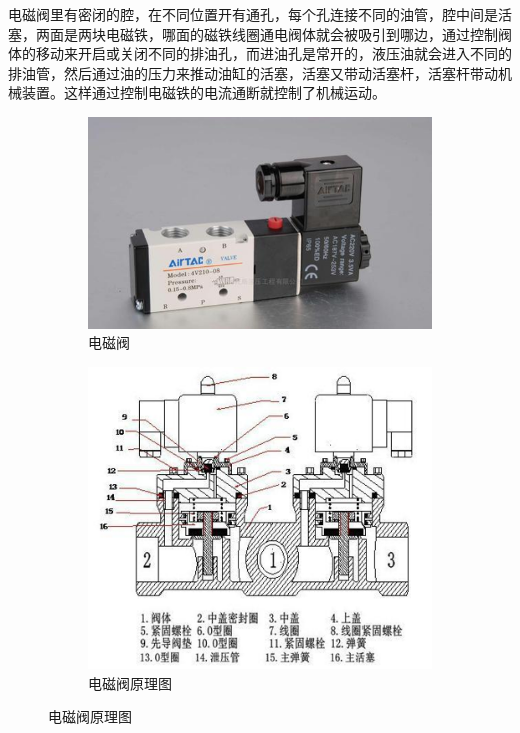 \documentclass[UTF8]{article} %
\begin{document}
\begin{enumerate}
  电磁阀里有密闭的腔，在不同位置开有通孔，每个孔连接不同的油管，腔中间是活塞，两面是两块电磁铁，哪面的磁铁线圈通电阀体就会被吸引到哪边，通过控制阀体的移动来开启或关闭不同的排油孔，而进油孔是常开的，液压油就会进入不同的排油管，然后通过油的压力来推动油缸的活塞，活塞又带动活塞杆，活塞杆带动机械装置。这样通过控制电磁铁的电流通断就控制了机械运动。

  \begin{figure}[H]
    \centering
    \begin{subfigure}[b]{0.4\textwidth}
           \centering
           \includegraphics[width=\textwidth]{qi4.png}
            \caption{电磁阀}
    \end{subfigure}
    \quad
    \begin{subfigure}[b]{0.3\textwidth}
            \centering
            \includegraphics[width=\textwidth]{qi5.png}
            \caption{电磁阀原理图}
    \end{subfigure}
  \end{figure}


\end{enumerate}
\end{document}
